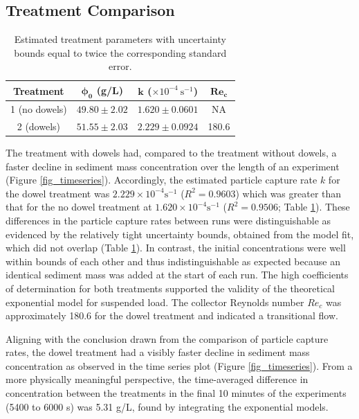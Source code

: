 \documentclass[12pt]{article}
\begin{document}
\subsection{Treatment Comparison}

\begin{table}[H]
    \centering
    \caption{Estimated treatment parameters with uncertainty bounds equal to twice the corresponding standard error.}
    \label{tab_estimates}
    \begin{tabular}{c c c c}
        \textbf{Treatment} & $\boldsymbol{\phi_0}$ (g/L) & $\boldsymbol{k}$ ($\times 10^{-4} \ \text{s}^{-1}$) & $\boldsymbol{Re_c}$ \\
        \hline
        1 (no dowels) & $49.80 \pm 2.02$ & $1.620 \pm 0.0601$ & NA \\
        \hline
        2 (dowels) & $51.55 \pm 2.03$ & $2.229 \pm 0.0924$ & 180.6 \\
        \hline
    \end{tabular}
\end{table}

The treatment with dowels had, compared to the treatment without dowels, a faster decline in sediment mass concentration over the length of an experiment (Figure \ref{fig_timeseries}). Accordingly, the estimated particle capture rate $k$ for the dowel treatment was $2.229 \times 10^{-4} \text{s}^{-1}$ ($R^2=0.9603$) which was greater than that for the no dowel treatment at $1.620 \times 10^{-4} \text{s}^{-1}$ ($R^2=0.9506$; Table \ref{tab_estimates}). These differences in the particle capture rates between runs were distinguishable as evidenced by the relatively tight uncertainty bounds, obtained from the model fit, which did not overlap (Table \ref{tab_estimates}). In contrast, the initial concentrations were well within bounds of each other and thus indistinguishable as expected because an identical sediment mass was added at the start of each run. The high coefficients of determination for both treatments supported the validity of the theoretical exponential model for suspended load. The collector Reynolds number $Re_c$ was approximately 180.6 for the dowel treatment and indicated a transitional flow.

Aligning with the conclusion drawn from the comparison of particle capture rates, the dowel treatment had a visibly faster decline in sediment mass concentration as observed in the time series plot (Figure \ref{fig_timeseries}). From a more physically meaningful perspective, the time-averaged difference in concentration between the treatments in the final 10 minutes of the experiments (5400 to 6000 s) was 5.31 g/L, found by integrating the exponential models.
\end{document}

